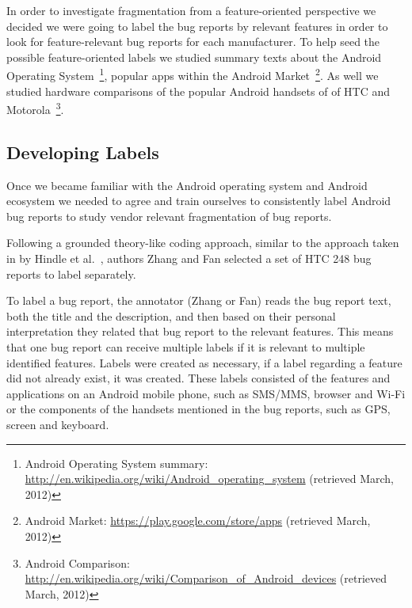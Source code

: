 \documentclass[10pt, conference, compsocconf]{IEEEtran}
\begin{document}

In order to investigate fragmentation from a feature-oriented
perspective we decided we were going to label the bug reports by
relevant features in order to look for feature-relevant bug reports
for each manufacturer.
To help seed the possible feature-oriented labels we 
studied summary texts about the Android Operating
System~\footnote{Android Operating System summary:
\url{http://en.wikipedia.org/wiki/Android_operating_system} (retrieved
March, 2012)}, 
popular apps within the Android Market~\footnote{Android Market:
  \url{https://play.google.com/store/apps} (retrieved March, 2012)}.
As well we studied hardware comparisons of the popular Android handsets of 
 of HTC and Motorola~\footnote{Android Comparison:
  \url{http://en.wikipedia.org/wiki/Comparison_of_Android_devices}
  (retrieved March, 2012)}.

\subsection{Developing Labels}


Once we became familiar with the Android operating system and Android
ecosystem we needed to agree and train ourselves to consistently label
Android bug reports to study vendor relevant fragmentation of bug reports.


Following a grounded theory-like coding approach, similar to the
approach taken in by Hindle et al.~\cite{Hindle2011}, authors Zhang
and Fan selected a set of HTC 248 bug reports to label
separately. 

To label a bug report, the annotator (Zhang or Fan) reads the bug
report text, both the title and the description, and  then based on their
personal interpretation they related that bug report to the relevant
features. This means that one bug report can receive multiple labels
if it is relevant to multiple identified features. Labels were created
as necessary, if a label regarding a feature did not already exist, it
was created.
These labels 
consisted of the features and applications on an Android mobile
phone, such as SMS/MMS, browser and Wi-Fi or the components of the
handsets mentioned in the bug reports, such as GPS, screen and
keyboard.
\end{document}
